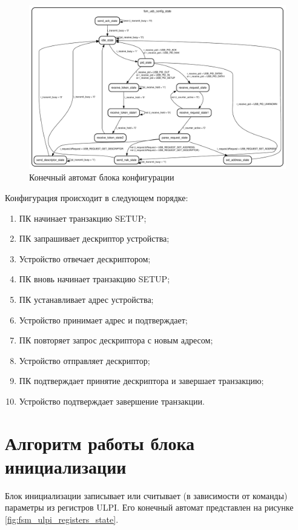 \begin{figure}[ht]
    \centering
    \includegraphics[scale=0.45]{res/img/fsm_usb_config_state.pdf}
    \caption{Конечный автомат блока конфигурации}
    \label{fig:fsm_usb_config_state}
\end{figure}

Конфигурация происходит в следующем порядке:

\begin{enumerate}
\item ПК начинает транзакцию SETUP;
\item ПК запрашивает дескриптор устройства;
\item Устройство отвечает дескриптором;
\item ПК вновь начинает транзакцию SETUP;
\item ПК устанавливает адрес устройства;
\item Устройство принимает адрес и подтверждает;
\item ПК повторяет запрос дескриптора с новым адресом;
\item Устройство отправляет дескриптор;
\item ПК подтверждает принятие дескриптора и завершает транзакцию;
\item Устройство подтверждает завершение транзакции.
\end{enumerate}

\section{Алгоритм работы блока инициализации}

Блок инициализации записывает или считывает (в зависимости от команды) параметры из регистров ULPI. Его конечный автомат представлен на рисунке \ref{fig:fsm_ulpi_registers_state}.

